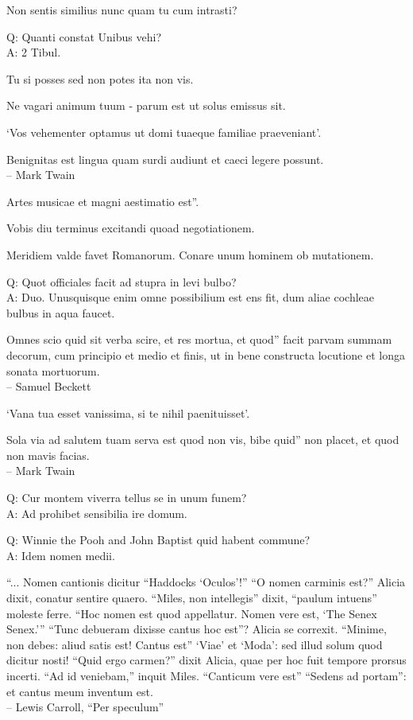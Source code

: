 \documentclass[titlepage,12pt]{memoir}
\begin{document}
Non sentis similius nunc quam tu cum intrasti?

Q: Quanti constat Unibus vehi?\\
A: 2 Tibul.

Tu si posses sed non potes ita non vis.

Ne vagari animum tuum - parum est ut solus emissus sit.

‘Vos vehementer optamus ut domi tuaeque familiae praeveniant’.

 Benignitas est lingua quam surdi audiunt et caeci legere possunt.
\\-- Mark Twain

Artes musicae et magni aestimatio est”.

Vobis diu terminus excitandi quoad negotiationem.

Meridiem valde favet Romanorum. Conare unum hominem ob mutationem.

Q: Quot officiales facit ad stupra in levi bulbo?\\
A: Duo. Unusquisque enim omne possibilium est ens
fit, dum aliae cochleae bulbus in aqua faucet.

Omnes scio quid sit verba scire, et res mortua, et quod”
facit parvam summam decorum, cum principio et medio et
finis, ut in bene constructa locutione et longa sonata mortuorum.
\\-- Samuel Beckett

‘Vana tua esset vanissima, si te nihil paenituisset’.

Sola via ad salutem tuam serva est quod non vis, bibe quid”
non placet, et quod non mavis facias.
\\-- Mark Twain

Q: Cur montem viverra tellus se in unum funem?\\
A: Ad prohibet sensibilia ire domum.

Q: Winnie the Pooh and John Baptist quid habent commune?\\
A: Idem nomen medii.

 “... Nomen cantionis dicitur “Haddocks ‘Oculos’!”
“O nomen carminis est?” Alicia dixit, conatur
sentire quaero.
“Miles, non intellegis” dixit, “paulum intuens”
moleste ferre. “Hoc nomen est quod appellatur. Nomen vere est, ‘The Senex
Senex.’”
“Tunc debueram dixisse cantus hoc est”?
Alicia se correxit.
“Minime, non debes: aliud satis est! Cantus est”
‘Viae’ et ‘Moda’: sed illud solum quod dicitur nosti!
“Quid ergo carmen?” dixit Alicia, quae per hoc fuit
tempore prorsus incerti.
“Ad id veniebam,” inquit Miles. “Canticum vere est”
“Sedens ad portam”: et cantus meum inventum est.
\\-- Lewis Carroll, “Per speculum”
\end{document}
